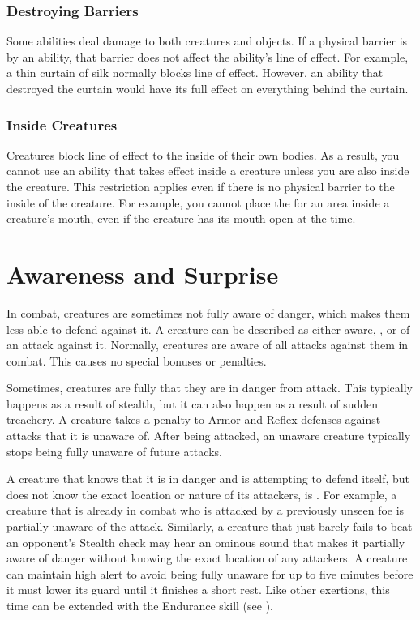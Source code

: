     \subsubsection{Destroying Barriers}\label{Destroying Barriers}
      Some abilities deal damage to both creatures and objects.
      If a physical barrier is  by an ability, that barrier does not affect the ability's line of effect.
      For example, a thin curtain of silk normally blocks line of effect.
      However, an ability that destroyed the curtain would have its full effect on everything behind the curtain.

    \subsubsection{Inside Creatures}
      Creatures block line of effect to the inside of their own bodies.
      As a result, you cannot use an ability that takes effect inside a creature unless you are also inside the creature.
      This restriction applies even if there is no physical barrier to the inside of the creature.
      For example, you cannot place the  for an area inside a creature's mouth, even if the creature has its mouth open at the time.

\section{Awareness and Surprise}\label{Awareness and Surprise}
  In combat, creatures are sometimes not fully aware of danger, which makes them less able to defend against it.
  A creature can be described as either aware, \unaware, or \partiallyunaware of an attack against it.
  Normally, creatures are aware of all attacks against them in combat.
  This causes no special bonuses or penalties.

  Sometimes, creatures are fully \unaware that they are in danger from attack.
  This typically happens as a result of stealth, but it can also happen as a result of sudden treachery.
  A creature takes a  penalty to Armor and Reflex defenses against attacks that it is unaware of.
  After being attacked, an unaware creature typically stops being fully unaware of future attacks.

  A creature that knows that it is in danger and is attempting to defend itself, but does not know the exact location or nature of its attackers, is \partiallyunaware.
  For example, a creature that is already in combat who is attacked by a previously unseen foe is partially unaware of the attack.
  Similarly, a creature that just barely fails to beat an opponent's Stealth check may hear an ominous sound that makes it partially aware of danger without knowing the exact location of any attackers.
  A creature can maintain high alert to avoid being fully unaware for up to five minutes before it must lower its guard until it finishes a short rest.
  Like other exertions, this time can be extended with the Endurance skill (see ).

